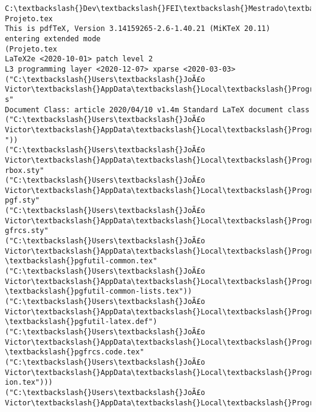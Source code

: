 \documentclass[11pt]{article}
\begin{document}
\begin{Verbatim}[commandchars=\\\{\}]
C:\textbackslash{}Dev\textbackslash{}FEI\textbackslash{}Mestrado\textbackslash{}3\_Periodo\textbackslash{}PEL301\_Biopotenciais\textbackslash{}Projeto>pdflatex Projeto.tex
This is pdfTeX, Version 3.14159265-2.6-1.40.21 (MiKTeX 20.11)
entering extended mode
(Projeto.tex
LaTeX2e <2020-10-01> patch level 2
L3 programming layer <2020-12-07> xparse <2020-03-03>
("C:\textbackslash{}Users\textbackslash{}JoÃ£o Victor\textbackslash{}AppData\textbackslash{}Local\textbackslash{}Programs\textbackslash{}MiKTeX\textbackslash{}tex/latex/base\textbackslash{}article.cl
s"
Document Class: article 2020/04/10 v1.4m Standard LaTeX document class
("C:\textbackslash{}Users\textbackslash{}JoÃ£o Victor\textbackslash{}AppData\textbackslash{}Local\textbackslash{}Programs\textbackslash{}MiKTeX\textbackslash{}tex/latex/base\textbackslash{}size11.clo
"))
("C:\textbackslash{}Users\textbackslash{}JoÃ£o Victor\textbackslash{}AppData\textbackslash{}Local\textbackslash{}Programs\textbackslash{}MiKTeX\textbackslash{}tex/latex/tcolorbox\textbackslash{}tcolo
rbox.sty"
("C:\textbackslash{}Users\textbackslash{}JoÃ£o Victor\textbackslash{}AppData\textbackslash{}Local\textbackslash{}Programs\textbackslash{}MiKTeX\textbackslash{}tex/latex/pgf/basiclayer\textbackslash{}
pgf.sty"
("C:\textbackslash{}Users\textbackslash{}JoÃ£o Victor\textbackslash{}AppData\textbackslash{}Local\textbackslash{}Programs\textbackslash{}MiKTeX\textbackslash{}tex/latex/pgf/utilities\textbackslash{}p
gfrcs.sty"
("C:\textbackslash{}Users\textbackslash{}JoÃ£o Victor\textbackslash{}AppData\textbackslash{}Local\textbackslash{}Programs\textbackslash{}MiKTeX\textbackslash{}tex/generic/pgf/utilities
\textbackslash{}pgfutil-common.tex"
("C:\textbackslash{}Users\textbackslash{}JoÃ£o Victor\textbackslash{}AppData\textbackslash{}Local\textbackslash{}Programs\textbackslash{}MiKTeX\textbackslash{}tex/generic/pgf/utilities
\textbackslash{}pgfutil-common-lists.tex"))
("C:\textbackslash{}Users\textbackslash{}JoÃ£o Victor\textbackslash{}AppData\textbackslash{}Local\textbackslash{}Programs\textbackslash{}MiKTeX\textbackslash{}tex/generic/pgf/utilities
\textbackslash{}pgfutil-latex.def")
("C:\textbackslash{}Users\textbackslash{}JoÃ£o Victor\textbackslash{}AppData\textbackslash{}Local\textbackslash{}Programs\textbackslash{}MiKTeX\textbackslash{}tex/generic/pgf/utilities
\textbackslash{}pgfrcs.code.tex"
("C:\textbackslash{}Users\textbackslash{}JoÃ£o Victor\textbackslash{}AppData\textbackslash{}Local\textbackslash{}Programs\textbackslash{}MiKTeX\textbackslash{}tex/generic/pgf\textbackslash{}pgf.revis
ion.tex")))
("C:\textbackslash{}Users\textbackslash{}JoÃ£o Victor\textbackslash{}AppData\textbackslash{}Local\textbackslash{}Programs\textbackslash{}MiKTeX\textbackslash{}tex/latex/pgf/basiclayer\textbackslash{}

\end{Verbatim}
\end{document}
